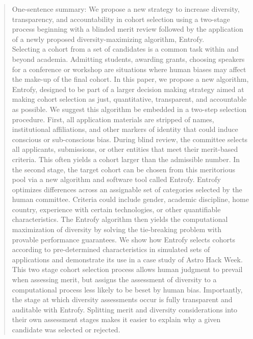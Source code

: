\documentclass[12pt]{article}
\newenvironment{sciabstract}{%
\begin{quote} \bf}
{\end{quote}}
\newcommand{\BMN}[1]{\textcolor{blue}{BM:~#1}\normalcolor{}}
\begin{document}
\begin{sciabstract}

One-sentence summary: We propose a new strategy to increase diversity, transparency, and accountability in cohort selection using a two-stage process beginning with a blinded merit review followed by the application of a newly proposed diversity-maximizing algorithm, Entrofy. \\

\noindent Selecting a cohort from a set of candidates is a common task within and beyond academia. Admitting students, awarding grants, choosing speakers for a conference or workshop are situations where human biases may affect the make-up of the final cohort. In this paper, we propose a new algorithm, Entrofy, designed to be part of a larger decision making strategy aimed at making cohort selection as just, quantitative, transparent, and accountable as possible.
\noindent We suggest this algorithm be embedded in a two-step selection procedure. First, all application materials are stripped of names, institutional affiliations, and other markers of identity that could induce conscious or sub-conscious bias. During blind review, the committee selects all applicants, submissions, or other entities that meet their merit-based criteria. This often yields a cohort larger than the admissible number.
\noindent In the second stage, the target cohort can be chosen from this meritorious pool via a new algorithm and software tool called Entrofy. Entrofy optimizes differences across an assignable set of categories selected by the human committee. Criteria could include gender, academic discipline, home country, experience with certain technologies, or other quantifiable characteristics. The Entrofy algorithm then yields the computational maximization of diversity by solving the tie-breaking problem with provable performance guarantees. We show how Entrofy selects cohorts according to pre-determined characteristics in simulated sets of applications and demonstrate its use in a case study of Astro Hack Week. 
\noindent This two stage cohort selection process allows human judgment to prevail when assessing merit, but assigns the assessment of diversity to a computational process less likely to be beset by human bias. Importantly, the stage at which diversity assessments occur is fully transparent and auditable with Entrofy. Splitting merit and diversity considerations into their own assessment stages makes it easier to explain why a given candidate was selected or rejected. 



\end{sciabstract}
\end{document}
